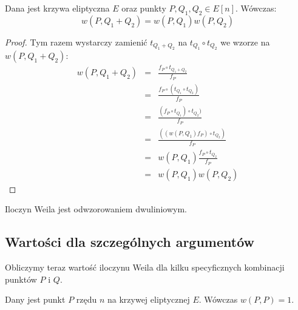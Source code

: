 \begin{lemma}
Dana jest krzywa eliptyczna $E$ oraz punkty $P, Q_1, Q_2 \in E[n]$.
Wówczas:
\begin{equation}
w(P, Q_1 + Q_2) = w(P, Q_1)w(P, Q_2)
\end{equation}
\end{lemma}

\begin{proof}
Tym razem wystarczy zamienić $t_{Q_1 + Q_2}$ na $t_{Q_1} \circ t_{Q_2}$
we wzorze na $w(P, Q_1 + Q_2)$:
\begin{eqnarray*}
w(P, Q_1 + Q_2)
& = & \frac{f_P \circ t_{Q_1 + Q_2}}{f_P} \\
& = & \frac{f_P \circ (t_{Q_1} \circ t_{Q_2})}{f_P} \\
& = & \frac{(f_P \circ t_{Q_1}) \circ t_{Q_2})}{f_P} \\
& = & \frac{((w(P,Q_1)f_P) \circ t_{Q_2})}{f_P} \\
& = & w(P, Q_1)\frac{f_P \circ t_{Q_2}}{f_P} \\
& = & w(P, Q_1)w(P, Q_2)
\end{eqnarray*}
\end{proof}

\begin{corollary}
Iloczyn Weila jest odwzorowaniem dwuliniowym.
\end{corollary}

\subsection*{Wartości dla szczególnych argumentów}

\noindent
Obliczymy teraz wartość iloczynu Weila
dla kilku specyficznych kombinacji punktów $P$ i $Q$.

\begin{theorem}
Dany jest punkt $P$ rzędu $n$ na krzywej eliptycznej $E$.
Wówczas $w(P, P) = 1$.
\end{theorem}

